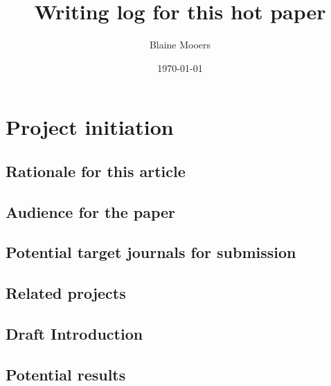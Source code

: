 \documentclass[11pt,letterpaper]{article}
\author{Blaine Mooers}
\date{\today}
\title{Writing log for this hot paper}
\begin{document}
\maketitle


\maketitle


\tableofcontents




\section{Project initiation}
\label{sec:org705758a}


\subsection{Rationale for this article}
\label{sec:org61e5f8d}

\subsection{Audience for the paper}
\label{sec:org76ee2fb}



\subsection{Potential target journals for submission}
\label{sec:org498c3a1}




\subsection{Related projects}
\label{sec:org4925286}

\subsection{Draft Introduction}
\label{sec:org441690d}



\subsection{Potential results}
\label{sec:org4d9ce3c}
\end{document}
